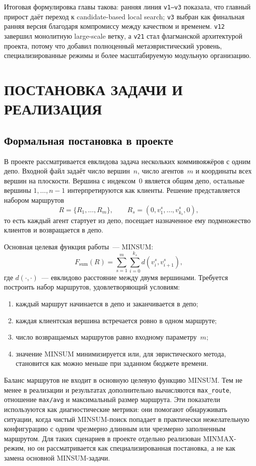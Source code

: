 \documentclass[14pt,a4paper]{extarticle}
\begin{document}
Итоговая формулировка главы такова: ранняя линия \texttt{v1--v3} показала, что главный прирост даёт переход к candidate-based local search; \texttt{v3} выбран как финальная ранняя версия благодаря компромиссу между качеством и временем. \texttt{v12} завершил монолитную large-scale ветку, а \texttt{v21} стал флагманской архитектурой проекта, потому что добавил полноценный метаэвристический уровень, специализированные режимы и более масштабируемую модульную организацию.

\section{ПОСТАНОВКА ЗАДАЧИ И РЕАЛИЗАЦИЯ}

\subsection{Формальная постановка в проекте}

В проекте рассматривается евклидова задача нескольких коммивояжёров с одним депо. Входной файл задаёт число вершин~$n$, число агентов~$m$ и координаты всех вершин на плоскости. Вершина с индексом~$0$ является общим депо, остальные вершины $1,\ldots,n-1$ интерпретируются как клиенты. Решение представляется набором маршрутов
\[
R = \{R_1,\ldots,R_m\}, \qquad
R_s = (0, v^s_1,\ldots,v^s_{k_s},0),
\]
то есть каждый агент стартует из депо, посещает назначенное ему подмножество клиентов и возвращается в депо.

Основная целевая функция работы~--- MINSUM:
\[
F_{\mathrm{sum}}(R)=\sum_{s=1}^{m}\sum_{i=0}^{k_s} d(v^s_i,v^s_{i+1}),
\]
где $d(\cdot,\cdot)$~--- евклидово расстояние между двумя вершинами. Требуется построить набор маршрутов, удовлетворяющий условиям:
\begin{enumerate}
  \item каждый маршрут начинается в депо и заканчивается в депо;
  \item каждая клиентская вершина встречается ровно в одном маршруте;
  \item число возвращаемых маршрутов равно входному параметру~$m$;
  \item значение MINSUM минимизируется или, для эвристического метода, становится как можно меньше при заданном бюджете времени.
\end{enumerate}

Баланс маршрутов не входит в основную целевую функцию MINSUM. Тем не менее в реализации и результатах дополнительно вычисляются \texttt{max\_route}, отношение \texttt{max/avg} и максимальный размер маршрута. Эти показатели используются как диагностические метрики: они помогают обнаруживать ситуации, когда чистый MINSUM-поиск попадает в практически нежелательную конфигурацию с одним чрезмерно длинным или чрезмерно заполненным маршрутом. Для таких сценариев в проекте отдельно реализован MINMAX-режим, но он рассматривается как специализированная постановка, а не как замена основной MINSUM-задачи.
\end{document}

